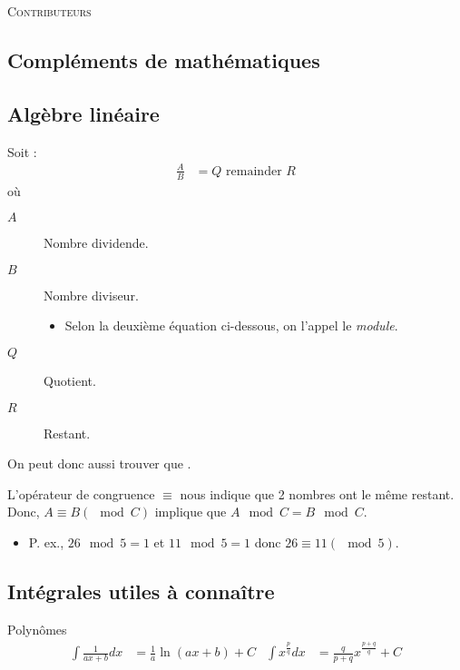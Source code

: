 \documentclass[10pt, french]{article}
\begin{document}
\begin{center}
	\textsc{\Large Contributeurs}\\[0.5cm] 
\end{center}


\newpage
\raggedcolumns
\begin{multicols*}{2}

\section{Compléments de mathématiques}
\subsection*{Algèbre linéaire}
Soit :
\begin{align*}
	\frac{A}{B}	
	&=	Q \text{ remainder } R
\end{align*}
où 
\begin{description}
	\item[$A$]	Nombre dividende.
	\item[$B$]	Nombre diviseur.
		\begin{itemize}
		\item	Selon la deuxième équation ci-dessous, on l'appel le \textit{module}.
		\end{itemize}
	\item[$Q$]	Quotient.
	\item[$R$]	Restant.
\end{description}

On peut donc aussi trouver que .

L'opérateur de congruence $\equiv$ nous indique que 2 nombres ont le même restant.
Donc, $A \equiv B (\mod C)$ implique que $A \mod C = B \mod C$.
\begin{itemize}
	\item P. ex., $26 \mod 5	=	1$ et $11 \mod 5 = 1$ donc $26 \equiv 11 (\mod 5)$.
\end{itemize}

\subsection*{Intégrales utiles à connaître}
\begin{conceptgen}{Polynômes}
\begin{align*}
	\int \frac{1}{ax + b} dx 
	&=	\frac{1}{a} \ln(ax + b) + C	&
	\int x^{\frac{p}{q}}dx
	&=	\frac{q}{p + q} x^{\frac{p + q}{q}} + C	
\end{align*}
\end{conceptgen}


\end{multicols*}
\end{document}
